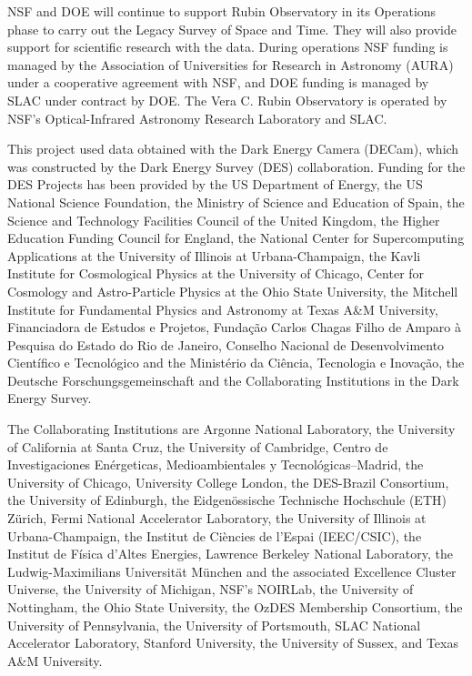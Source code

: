 \documentclass[twocolumn,trackchanges]{aastex63}
\begin{document}
NSF and DOE will continue to support Rubin Observatory in its Operations phase to carry out the Legacy Survey of Space and Time. They will also provide support for scientific research with the data. During operations NSF funding is managed by the Association of Universities for Research in Astronomy (AURA) under a cooperative agreement with NSF, and DOE funding is managed by SLAC under contract by DOE. The Vera C. Rubin Observatory is operated by NSF's Optical-Infrared Astronomy Research Laboratory and SLAC.

This project used data obtained with the Dark Energy Camera (DECam), which was constructed by the Dark Energy Survey (DES) collaboration. Funding for the DES Projects has been provided by the US Department of Energy, the US National Science Foundation, the Ministry of Science and Education of Spain, the Science and Technology Facilities Council of the United Kingdom, the Higher Education Funding Council for England, the National Center for Supercomputing Applications at the University of Illinois at Urbana-Champaign, the Kavli Institute for Cosmological Physics at the University of Chicago, Center for Cosmology and Astro-Particle Physics at the Ohio State University, the Mitchell Institute for Fundamental Physics and Astronomy at Texas A\&M University, Financiadora de Estudos e Projetos, Fundação Carlos Chagas Filho de Amparo à Pesquisa do Estado do Rio de Janeiro, Conselho Nacional de Desenvolvimento Científico e Tecnológico and the Ministério da Ciência, Tecnologia e Inovação, the Deutsche Forschungsgemeinschaft and the Collaborating Institutions in the Dark Energy Survey.

The Collaborating Institutions are Argonne National Laboratory, the University of California at Santa Cruz, the University of Cambridge, Centro de Investigaciones Enérgeticas, Medioambientales y Tecnológicas–Madrid, the University of Chicago, University College London, the DES-Brazil Consortium, the University of Edinburgh, the Eidgenössische Technische Hochschule (ETH) Zürich, Fermi National Accelerator Laboratory, the University of Illinois at Urbana-Champaign, the Institut de Ciències de l’Espai (IEEC/CSIC), the Institut de Física d’Altes Energies, Lawrence Berkeley National Laboratory, the Ludwig-Maximilians Universität München and the associated Excellence Cluster Universe, the University of Michigan, NSF’s NOIRLab, the University of Nottingham, the Ohio State University, the OzDES Membership Consortium, the University of Pennsylvania, the University of Portsmouth, SLAC National Accelerator Laboratory, Stanford University, the University of Sussex, and Texas A\&M University.
\end{document}
